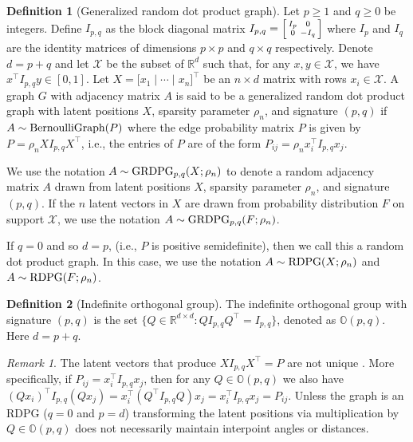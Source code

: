 \documentclass[
  12pt,
]{article}
\theoremstyle{definition}
\newtheorem{definition}{Definition}[section]
\theoremstyle{definition}
\theoremstyle{definition}
\theoremstyle{definition}
\theoremstyle{remark}
\newtheorem{remark}{Remark}
\begin{document}
\begin{definition}[Generalized random dot product graph]
\label{def:grdpg}
Let $p \geq 1$ and $q \geq 0$ be integers. 
Define $I_{p,q}$ as the block diagonal matrix $I_{p,q} = \Bigl[\begin{smallmatrix} I_{p} & 0 \\ 0 & - I_{q} \end{smallmatrix} \Bigr]$ where $I_p$ and $I_q$ are the identity matrices of dimensions $p \times p$ and $q \times q$ respectively. 
Denote $d = p + q$ and let $\mathcal{X}$ be the subset of $\mathbb{R}^d$ such that, for any $x, y \in \mathcal{X}$, we have $x^\top I_{p,q} y \in [0, 1]$. 
Let $X = \Big[ x_1 \mid \cdots \mid x_n \Big]^\top$ be an $n \times d$ matrix with rows $x_i \in \mathcal{X}$. 
A graph $G$ with adjacency matrix $A$ is said to be a generalized random dot product graph with latent positions $X$, sparsity parameter $\rho_n$, and signature $(p, q)$ if $A \sim \mathrm{BernoulliGraph}(P)$ where the edge probability matrix $P$ is given by $P = \rho_n X I_{p,q} X^\top$, i.e., the entries of $P$ are of the form $P_{ij} = \rho_n x_i^\top I_{p,q} x_j$. 

We use the notation $A \sim \mathrm{GRDPG}_{p,q}(X; \rho_n)$ to denote a random adjacency matrix $A$ drawn from latent positions $X$, sparsity parameter $\rho_n$, and signature $(p, q)$. If the $n$ latent vectors in $X$ are drawn from probability distribution $F$ on support $\mathcal{X}$, we use the notation $A \sim \mathrm{GRDPG}_{p,q}(F; \rho_n)$. 

If $q = 0$ and so $d = p$, (i.e., $P$ is positive semidefinite), then we call this a random dot product graph. 
In this case, we use the notation $A \sim \mathrm{RDPG}(X; \rho_n)$ and $A \sim \mathrm{RDPG}(F; \rho_n)$. 
\end{definition}

\begin{definition}[Indefinite orthogonal group]
\label{def:indefinite}
The indefinite orthogonal group with signature $(p, q)$ is
the set $\{Q \in \mathbb{R}^{d \times d} \colon Q I_{p, q} Q^{\top} = I_{p, q}\}$,
denoted as $\mathbb{O}(p, q)$. Here $d = p + q$. 
\end{definition}

\begin{remark}
\label{rem:non_identifiable}
The latent vectors that produce $X I_{p,q} X^\top = P$ are not unique
\citep{rubindelanchy2017statistical}.
More specifically, if $P_{ij} = x_i^\top I_{p, q} x_j$, then for any $Q \in \mathbb{O}(p, q)$ we also have 
$(Q x_i)^\top I_{p, q} (Q x_j) = x_i^\top (Q^\top I_{p, q} Q) x_j = x_i^\top I_{p, q} x_j = P_{ij}$. 
Unless the graph is an RDPG ($q = 0$ and $p = d$) transforming the latent positions via multiplication by $Q \in \mathbb{O}(p, q)$ does not necessarily maintain interpoint angles or distances.
\end{remark}
\end{document}
